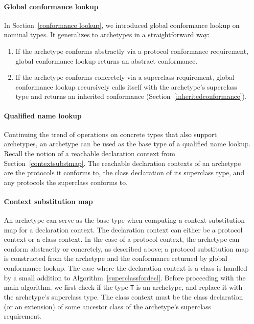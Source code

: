 \documentclass[a4paper,headsepline,bibliography=totoc,toc=flat,fleqn,twoside=semi]{scrbook}
\theoremstyle{definition}
\theoremstyle{definition}
\theoremstyle{definition}
\begin{document}
\paragraph{Global conformance lookup} In Section~\ref{conformance lookup}, we introduced global conformance lookup on nominal types. It generalizes to archetypes in a straightforward way:
\begin{enumerate}
\item If the archetype conforms abstractly via a protocol conformance requirement, global conformance lookup returns an abstract conformance.
\item If the archetype conforms concretely via a superclass requirement, global conformance lookup recursively calls itself with the archetype's superclass type and returns an inherited conformance (Section~\ref{inheritedconformance}).
\end{enumerate}

\paragraph{Qualified name lookup} Continuing the trend of operations on concrete types that also support archetypes, an archetype can be used as the base type of a qualified name lookup. Recall the notion of a reachable declaration context from Section~\ref{contextsubstmap}. The reachable declaration contexts of an archetype are the protocols it conforms to, the class declaration of its superclass type, and any protocols the superclass conforms to.

\paragraph{Context substitution map} An archetype can serve as the base type when computing a context substitution map for a declaration context. The declaration context can either be a protocol context or a class context. In the case of a protocol context, the archetype can conform abstractly or concretely, as described above; a protocol substitution map is constructed from the archetype and the conformance returned by global conformance lookup. The case where the declaration context is a class is handled by a small addition to Algorithm~\ref{superclassfordecl}. Before proceeding with the main algorithm, we first check if the type \texttt{T} is an archetype, and replace it with the archetype's superclass type. The class context must be the class declaration (or an extension) of some ancestor class of the archetype's superclass requirement.
\end{document}
